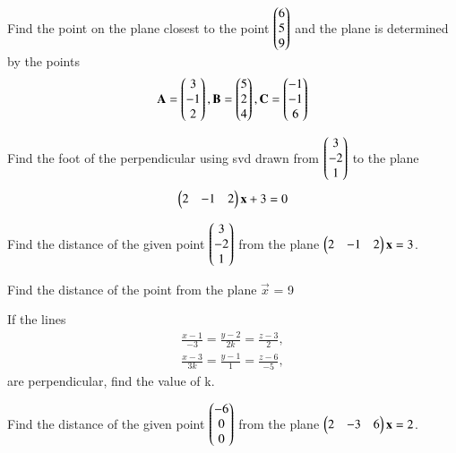 \solution

\item Find the point on the plane closest to the point $\begin{pmatrix}6\\5\\9\end{pmatrix}$ and the plane is determined by the points 
\begin{align*}
    \mathbf{A}=\begin{pmatrix}3\\-1\\2\end{pmatrix}, \mathbf{B}=\begin{pmatrix}5\\2\\4\end{pmatrix}, \mathbf{C}=\begin{pmatrix}-1\\-1\\6\end{pmatrix}
\end{align*}
\solution

%
 Find the foot of the perpendicular using svd drawn from $\begin{pmatrix}3\\-2\\1\end{pmatrix}$ to the plane
 \begin{align}
 \begin{pmatrix}2&-1&2\end{pmatrix}\mathbf{x}+3=0
 \end{align}
%
\solution
%
%
\item 
Find the distance of the given point $\begin{pmatrix}3\\-2\\1\end{pmatrix}$ from the plane $\begin{pmatrix}2&-1&2\end{pmatrix}\mathbf{x} = 3$.

\solution

%
\item Find the distance of the point  from the plane $\vec{x}$ = 9

\solution


\item If the lines
\begin{align}
	\frac{x - 1}{-3} = \frac{y - 2}{2k} = \frac{z - 3}{2},\\
	\frac{x - 3}{3k} = \frac{y - 1}{1} = \frac{z - 6}{-5},
\end{align}
are perpendicular, find the value of k.

\solution

%
\item Find the distance of the given point $\begin{pmatrix}-6\\0\\0\end{pmatrix}$ from the plane $\begin{pmatrix}2&-3&6\end{pmatrix}\mathbf{x} = 2$.
%
\\
\solution


